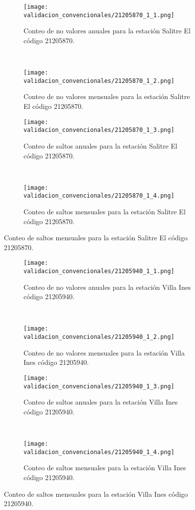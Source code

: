 \begin{figure}[H]\ContinuedFloat
\centering
	\begin{subfigure}[normla]{0.4\textwidth}
	\texttt{[image: validacion\_convencionales/21205870\_1\_1.png]}
		\caption{Conteo de no valores anuales para la estación Salitre El código 21205870.}
		\label{subfig:a1}
		\end{subfigure}
		~
    \begin{subfigure}[normla]{0.4\textwidth}
	\texttt{[image: validacion\_convencionales/21205870\_1\_2.png]}
		\caption{Conteo de no valores mensuales para la estación Salitre El código 21205870.}
		\label{subfig:a2}
		\end{subfigure}
		
    \begin{subfigure}[normla]{0.4\textwidth}
	\texttt{[image: validacion\_convencionales/21205870\_1\_3.png]}
		\caption{Conteo de saltos anuales para la estación Salitre El código 21205870.}
		\label{subfig:a1}
		\end{subfigure}
		~
    \begin{subfigure}[normla]{0.4\textwidth}
	\texttt{[image: validacion\_convencionales/21205870\_1\_4.png]}
		\caption{Conteo de saltos mensuales para la estación Salitre El código 21205870.}
		\label{subfig:a2}
		\end{subfigure}

	
\end{figure}
           
\begin{figure}[H]\ContinuedFloat
\centering
	\begin{subfigure}[normla]{0.4\textwidth}
	\texttt{[image: validacion\_convencionales/21205940\_1\_1.png]}
		\caption{Conteo de no valores anuales para la estación Villa Ines código 21205940.}
		\label{subfig:a1}
		\end{subfigure}
		~
    \begin{subfigure}[normla]{0.4\textwidth}
	\texttt{[image: validacion\_convencionales/21205940\_1\_2.png]}
		\caption{Conteo de no valores mensuales para la estación Villa Ines código 21205940.}
		\label{subfig:a2}
		\end{subfigure}
		
    \begin{subfigure}[normla]{0.4\textwidth}
	\texttt{[image: validacion\_convencionales/21205940\_1\_3.png]}
		\caption{Conteo de saltos anuales para la estación Villa Ines código 21205940.}
		\label{subfig:a1}
		\end{subfigure}
		~
    \begin{subfigure}[normla]{0.4\textwidth}
	\texttt{[image: validacion\_convencionales/21205940\_1\_4.png]}
		\caption{Conteo de saltos mensuales para la estación Villa Ines código 21205940.}
		\label{subfig:a2}
		\end{subfigure}

	
\end{figure}
           
